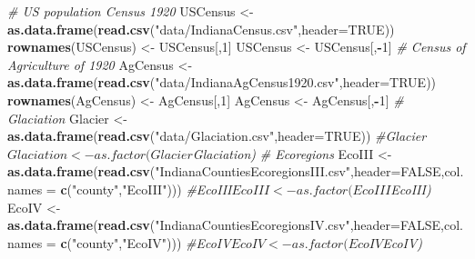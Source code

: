 \documentclass[
]{article}
\newenvironment{Shaded}{\begin{snugshade}}{\end{snugshade}}
\newcommand{\CommentTok}[1]{\textcolor[rgb]{0.56,0.35,0.01}{\textit{#1}}}
\newcommand{\DataTypeTok}[1]{\textcolor[rgb]{0.13,0.29,0.53}{#1}}
\newcommand{\DecValTok}[1]{\textcolor[rgb]{0.00,0.00,0.81}{#1}}
\newcommand{\KeywordTok}[1]{\textcolor[rgb]{0.13,0.29,0.53}{\textbf{#1}}}
\newcommand{\NormalTok}[1]{#1}
\newcommand{\OperatorTok}[1]{\textcolor[rgb]{0.81,0.36,0.00}{\textbf{#1}}}
\newcommand{\OtherTok}[1]{\textcolor[rgb]{0.56,0.35,0.01}{#1}}
\newcommand{\StringTok}[1]{\textcolor[rgb]{0.31,0.60,0.02}{#1}}
\begin{document}
\begin{Shaded}
\begin{Highlighting}[]
\CommentTok{# US population Census 1920}
\NormalTok{USCensus <-}\StringTok{ }\KeywordTok{as.data.frame}\NormalTok{(}\KeywordTok{read.csv}\NormalTok{(}\StringTok{"data/IndianaCensus.csv"}\NormalTok{,}\DataTypeTok{header=}\OtherTok{TRUE}\NormalTok{))}
\KeywordTok{rownames}\NormalTok{(USCensus) <-}\StringTok{ }\NormalTok{USCensus[,}\DecValTok{1}\NormalTok{]}
\NormalTok{USCensus <-}\StringTok{ }\NormalTok{USCensus[,}\OperatorTok{-}\DecValTok{1}\NormalTok{]}
\CommentTok{# Census of Agriculture of 1920}
\NormalTok{AgCensus <-}\StringTok{ }\KeywordTok{as.data.frame}\NormalTok{(}\KeywordTok{read.csv}\NormalTok{(}\StringTok{"data/IndianaAgCensus1920.csv"}\NormalTok{,}\DataTypeTok{header=}\OtherTok{TRUE}\NormalTok{))}
\KeywordTok{rownames}\NormalTok{(AgCensus) <-}\StringTok{ }\NormalTok{AgCensus[,}\DecValTok{1}\NormalTok{]}
\NormalTok{AgCensus <-}\StringTok{ }\NormalTok{AgCensus[,}\OperatorTok{-}\DecValTok{1}\NormalTok{]}
\CommentTok{# Glaciation}
\NormalTok{Glacier <-}\StringTok{ }\KeywordTok{as.data.frame}\NormalTok{(}\KeywordTok{read.csv}\NormalTok{(}\StringTok{"data/Glaciation.csv"}\NormalTok{,}\DataTypeTok{header=}\OtherTok{TRUE}\NormalTok{))}
\CommentTok{#Glacier$Glaciation<- as.factor(Glacier$Glaciation)}
\CommentTok{# Ecoregions}
\NormalTok{EcoIII <-}\StringTok{ }\KeywordTok{as.data.frame}\NormalTok{(}\KeywordTok{read.csv}\NormalTok{(}\StringTok{"IndianaCountiesEcoregionsIII.csv"}\NormalTok{,}\DataTypeTok{header=}\OtherTok{FALSE}\NormalTok{,}\DataTypeTok{col.names =} \KeywordTok{c}\NormalTok{(}\StringTok{"county"}\NormalTok{,}\StringTok{"EcoIII"}\NormalTok{)))}
\CommentTok{#EcoIII$EcoIII <- as.factor(EcoIII$EcoIII)}
\NormalTok{EcoIV <-}\StringTok{ }\KeywordTok{as.data.frame}\NormalTok{(}\KeywordTok{read.csv}\NormalTok{(}\StringTok{"IndianaCountiesEcoregionsIV.csv"}\NormalTok{,}\DataTypeTok{header=}\OtherTok{FALSE}\NormalTok{,}\DataTypeTok{col.names =} \KeywordTok{c}\NormalTok{(}\StringTok{"county"}\NormalTok{,}\StringTok{"EcoIV"}\NormalTok{)))}
\CommentTok{#EcoIV$EcoIV <- as.factor(EcoIV$EcoIV)}
\end{Highlighting}
\end{Shaded}
\end{document}
